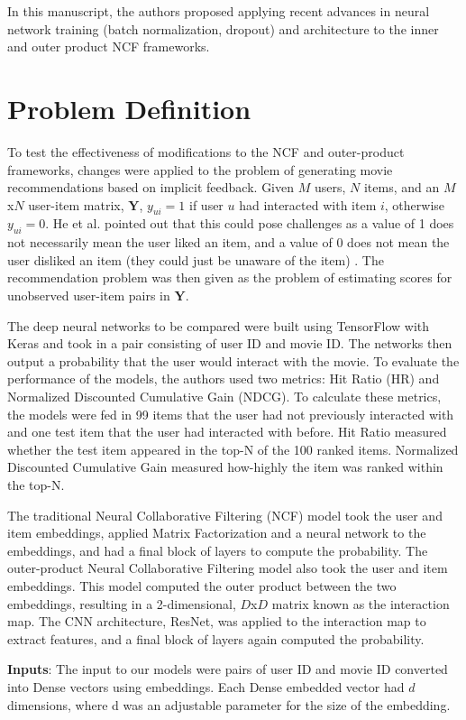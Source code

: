 \documentclass{article}
\begin{document}
In this manuscript, the authors proposed applying recent advances in neural network training (batch normalization, dropout) and architecture to the inner and outer product NCF frameworks.

\section{Problem Definition}
\label{sec:Problem Definition}
To test the effectiveness of modifications to the NCF and outer-product frameworks, changes were applied to the problem of generating movie recommendations based on implicit feedback. Given $M$ users, $N$ items, and an $M$x$N$ user-item matrix, $\mathbf{Y}$, $y_{ui} = 1$ if user $u$ had interacted with item $i$, otherwise $y_{ui} = 0$. He et al. pointed out that this could pose challenges as a value of 1 does not necessarily mean the user liked an item, and a value of 0 does not mean the user disliked an item (they could just be unaware of the item) \cite{he2017neural}. The recommendation problem was then given as the problem of estimating scores for unobserved user-item pairs in $\mathbf{Y}$.

The deep neural networks to be compared were built using TensorFlow with Keras and took in a pair consisting of user ID and movie ID. The networks then output a probability that the user would interact with the movie. To evaluate the performance of the models, the authors used two metrics: Hit Ratio (HR) and Normalized Discounted Cumulative Gain (NDCG). To calculate these metrics, the models were fed in 99 items that the user had not previously interacted with and one test item that the user had interacted with before. Hit Ratio measured whether the test item appeared in the top-N of the 100 ranked items. Normalized Discounted Cumulative Gain measured how-highly the item was ranked within the top-N.

The traditional Neural Collaborative Filtering (NCF) model took the user and item embeddings, applied Matrix Factorization and a neural network to the embeddings, and had a final block of layers to compute the probability. The outer-product Neural Collaborative Filtering model also took the user and item embeddings. This model computed the outer product between the two embeddings, resulting in a 2-dimensional, $D$x$D$ matrix known as the interaction map. The CNN architecture, ResNet, was applied to the interaction map to extract features, and a final block of layers again computed the probability.

\textbf{Inputs}: The input to our models were pairs of user ID and movie ID converted into Dense vectors using embeddings. Each Dense embedded vector had $d$ dimensions, where d was an adjustable parameter for the size of the embedding.
\end{document}
